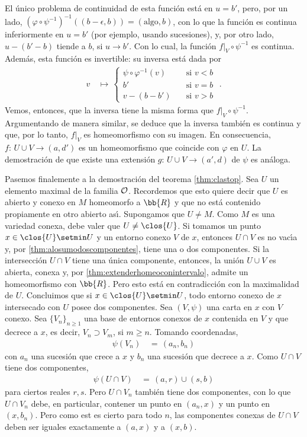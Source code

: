 %
El \'{u}nico problema de continuidad de esta funci\'{o}n est\'{a} en
$u=b'$, pero, por un lado,
$(\varphi\circ\psi^{-1})^{-1}((b-\epsilon,b))=(\text{algo},b)$, con lo
que la funci\'{o}n es continua inferiormente en $u=b'$ (por ejemplo, usando
sucesiones), y, por otro lado, $u-(b'-b)$ tiende a $b$, si $u\to b'$. Con
lo cual, la funci\'{o}n $f|_{V}\circ\psi^{-1}$ es continua. Adem\'{a}s,
esta funci\'{o}n es invertible: su inversa est\'{a} dada por
\begin{align*}
	v & \,\mapsto\,
		\begin{cases}
			\psi\circ\varphi^{-1}(v) & \quad\text{si } v<b \\
			b' & \quad\text{si } v=b \\
			v-(b-b') & \quad\text{si } v>b
		\end{cases}
	\text{ .}
\end{align*}
%
Vemos, entonces, que la inversa tiene la misma forma que
$f|_{V}\circ\psi^{-1}$. Argumentando de manera similar, se deduce que la
inversa tambi\'{e}n es continua y que, por lo tanto, $f|_{V}$ es
homeomorfismo con su imagen. En consecuencia, $f:\,U\cup V\rightarrow (a,d')$
es un homeomorfismo que coincide con $\varphi$ en $U$. La demostraci\'{o}n
de que existe una extensi\'{o}n $g:\,U\cup V\rightarrow (a',d)$ de $\psi$ es
an\'{a}loga.

Pasemos finalemente a la demostraci\'{o}n del teorema \ref{thm:clastop}.
Sea $U$ un elemento maximal de la familia $\cal{O}$. Recordemos
que esto quiere decir que $U$ es abierto y conexo en $M$ homeomorfo a
$\bb{R}$ y que no est\'{a} contenido propiamente en otro abierto as\'{\i}.
Supongamos que $U\not =M$. Como $M$ es una variedad conexa, debe valer
que $U\not =\clos{U}$. Si tomamos un punto $x\in\clos{U}\setmin U$ y un
entorno conexo $V$ de $x$, entonces $U\cap V$ es no vac\'{\i}a y, por
\ref{thm:alosumodoscomponentes}, tiene una o dos componentes. Si la
intersecci\'{o}n $U\cap V$ tiene una \'{u}nica componente, entonces,
la uni\'{o}n $U\cup V$ es abierta, conexa y, por
\ref{thm:extenderhomeoconintervalo}, admite un homeomorfismo con $\bb{R}$.
Pero esto est\'{a} en contradicci\'{o}n con la maximalidad de $U$.
Concluimos que si $x\in\clos{U}\setmin U$, todo entorno conexo de $x$
intersecado con $U$ posee dos componentes. Sea $(V,\psi)$ una carta en
$x$ con $V$ conexo. Sea $\{V_{n}\}_{n\geq 1}$ una base de entornos conexos
de $x$ contenida en $V$ y que decrece a $x$, es decir, $V_{n}\supset V_{m}$,
si $m\geq n$. Tomando coordenadas,
\begin{align*}
	\psi(V_{n}) & \,=\,(a_{n},b_{n})
\end{align*}
%
con $a_{n}$ una sucesi\'{o}n que crece a $x$ y $b_{n}$ una sucesi\'{o}n
que decrece a $x$. Como $U\cap V$ tiene dos componentes,
\begin{align*}
	\psi(U\cap V) & \,=\,(a,r)\cup (s,b)
\end{align*}
%
para ciertos reales $r,s$. Pero $U\cap V_{n}$ tambi\'{e}n tiene dos
componentes, con lo que $U\cap V_{n}$ debe, en particular, contener un
punto en $(a_{n},x)$ y un punto en $(x,b_{n})$. Pero como est es cierto
para todo $n$, las componentes conexas de $U\cap V$ deben ser iguales
exactamente a $(a,x)$ y a $(x,b)$.

